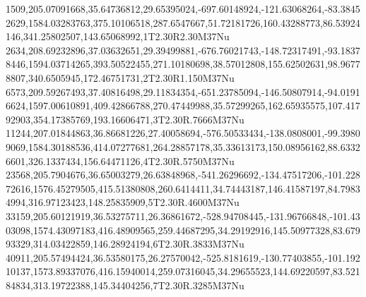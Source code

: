 1509,205.07091668,35.64736812,29.65395024,-697.60148924,-121.63068264,-83.38452629,1584.03283763,375.10106518,287.6547667,51.72181726,160.43288773,86.53924146,341.25802507,143.65068992,1T2.30R2.30M37Nu
2634,208.69232896,37.03632651,29.39499881,-676.76021743,-148.72317491,-93.18378446,1594.03714265,393.50522455,271.10180698,38.57012808,155.62502631,98.96778807,340.6505945,172.46751731,2T2.30R1.150M37Nu
6573,209.59267493,37.40816498,29.11834354,-651.23785094,-146.50807914,-94.01916624,1597.00610891,409.42866788,270.47449988,35.57299265,162.65935575,107.41792903,354.17385769,193.16606471,3T2.30R.7666M37Nu
11244,207.01844863,36.86681226,27.40058694,-576.50533434,-138.0808001,-99.39809069,1584.30188536,414.07277681,264.28857178,35.33613173,150.08956162,88.63326601,326.1337434,156.64471126,4T2.30R.5750M37Nu
23568,205.7904676,36.65003279,26.63848968,-541.26296692,-134.47517206,-101.22872616,1576.45279505,415.51380808,260.6414411,34.74443187,146.41587197,84.79834994,316.97123423,148.25835909,5T2.30R.4600M37Nu
33159,205.60121919,36.53275711,26.36861672,-528.94708445,-131.96766848,-101.4303098,1574.43097183,416.48909565,259.44687295,34.29192916,145.50977328,83.67993329,314.03422859,146.28924194,6T2.30R.3833M37Nu
40911,205.57494424,36.53580175,26.27570042,-525.8181619,-130.77403855,-101.19210137,1573.89337076,416.15940014,259.07316045,34.29655523,144.69220597,83.52184834,313.19722388,145.34404256,7T2.30R.3285M37Nu

